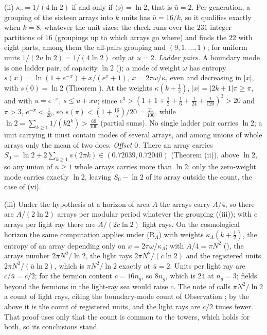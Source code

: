 (ii) $\kappa_{c} = 1/(4\ln 2)$ if and only if $\langle s\rangle = \ln 2$, that is $\bar u = 2$. Per generation, a grouping of the sixteen arrays into $k$ units has $\bar u = 16/k$, so it qualifies exactly when $k = 8$, whatever the unit sizes; the check runs over the $231$ integer partitions of $16$ (groupings up to which arrays go where) and finds the $22$ with eight parts, among them the all-pairs grouping and $(9, 1, \dots, 1)$; for uniform units $1/(2u\ln 2) = 1/(4\ln 2)$ only at $u = 2$. \emph{Ladder pairs.} A boundary mode is one ladder pair, of capacity $\ln 2$ (); a mode of weight $\omega$ has entropy $s(x) = \ln(1 + e^{-x}) + x/(e^{x} + 1)$, $x = 2\pi\omega/\kappa$, even and decreasing in $|x|$, with $s(0) = \ln 2$ (Theorem ). At the weights $\kappa(k + \tfrac12)$, $|x| = |2k + 1|\pi \ge \pi$, and with $u = e^{-x}$, $s \le u + xu$; since $e^{3} > (1 + 1 + \tfrac12 + \tfrac16 + \tfrac1{24} + \tfrac1{120})^{3} > 20$ and $\pi > 3$, $e^{-\pi} < \tfrac1{20}$, so $s(\pi) < (1 + \tfrac{16}{5})/20 = \tfrac{21}{100}$, while $\ln 2 = \sum_{k \ge 1}1/(k2^{k}) > \tfrac{69}{100}$ (partial sums). No single ladder pair carries $\ln 2$; a unit carrying it must contain modes of several arrays, and among unions of whole arrays only the mean of two does. \emph{Offset $0$.} There an array carries $S_{0} = \ln 2 + 2\sum_{k \ge 1}s(2\pi k) \in (0.72039, 0.72040)$ (Theorem (ii)), above $\ln 2$, so any union of $u \ge 1$ whole arrays carries more than $\ln 2$; only the zero-weight mode carries exactly $\ln 2$, leaving $S_{0} - \ln 2$ of its array outside the count, the case of (vi).

(iii) Under the hypothesis at a horizon of area $A$ the arrays carry $A/4$, so there are $A/(2\ln 2)$ arrays per modular period whatever the grouping ((iii)); with $c$ arrays per light ray there are $A/(2c\ln 2)$ light rays. On the cosmological horizon the same computation applies under (R$_{\Lambda}$) with weights $\kappa_{\Lambda}(k + \tfrac12)$, the entropy of an array depending only on $x = 2\pi\omega/\kappa_{\Lambda}$; with $A/4 = \pi N^{2}$ (), the arrays number $2\pi N^{2}/\ln 2$, the light rays $2\pi N^{2}/(c\ln 2)$ and the registered units $2\pi N^{2}/(\bar u\ln 2)$, which is $\pi N^{2}/\ln 2$ exactly at $\bar u = 2$. Units per light ray are $c/\bar u = c/2$; for the fermion content $c = 16n_{g}$, so $8n_{g}$, which is $24$ at $n_{g} = 3$; fields beyond the fermions in the light-ray sea would raise $c$. The note of  calls $\pi N^{2}/\ln 2$ a count of light rays, citing the boundary-mode count of Observation ; by the above it is the count of registered units, and the light rays are $c/2$ times fewer. That proof uses only that the count is common to the towers, which holds for both, so its conclusions stand.
